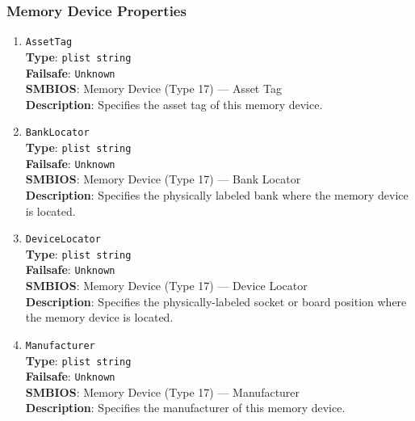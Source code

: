 \documentclass[]{article}
\begin{document}
\subsubsection{Memory Device Properties}\label{platforminfomemorydevice}

\begin{enumerate}

\item
  \texttt{AssetTag}\\
  \textbf{Type}: \texttt{plist\ string}\\
  \textbf{Failsafe}: \texttt{Unknown}\\
  \textbf{SMBIOS}: Memory Device (Type 17) --- Asset Tag\\
  \textbf{Description}: Specifies the asset tag of this memory device.

\item
  \texttt{BankLocator}\\
  \textbf{Type}: \texttt{plist\ string}\\
  \textbf{Failsafe}: \texttt{Unknown}\\
  \textbf{SMBIOS}: Memory Device (Type 17) --- Bank Locator\\
  \textbf{Description}: Specifies the physically labeled bank where the
  memory device is located.

\item
  \texttt{DeviceLocator}\\
  \textbf{Type}: \texttt{plist\ string}\\
  \textbf{Failsafe}: \texttt{Unknown}\\
  \textbf{SMBIOS}: Memory Device (Type 17) --- Device Locator\\
  \textbf{Description}: Specifies the physically-labeled socket or
  board position where the memory device is located.

\item
  \texttt{Manufacturer}\\
  \textbf{Type}: \texttt{plist\ string}\\
  \textbf{Failsafe}: \texttt{Unknown}\\
  \textbf{SMBIOS}: Memory Device (Type 17) --- Manufacturer\\
  \textbf{Description}: Specifies the manufacturer of this memory device.


\end{enumerate}
\end{document}
